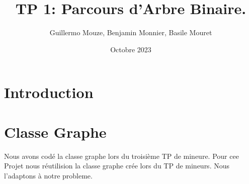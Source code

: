 \documentclass{article}
\title{TP 1: Parcours d'Arbre Binaire.}
\author{Guillermo Mouze, Benjamin Monnier, Basile Mouret}
\date{Octobre 2023}
\begin{document}
\maketitle
\tableofcontents{}

\section{Introduction}

\section{Classe Graphe}
Nous avons codé la classe graphe lors du troisième TP de mineure.
Pour cee Projet nous réutilision la classe graphe crée lors du TP de mineurs. Nous l'adaptons à
notre probleme.
\p
\end{document}
